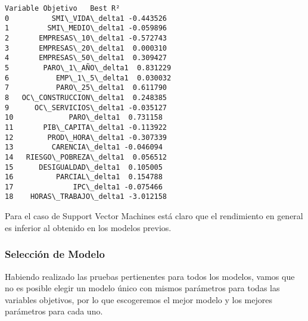 \documentclass[11pt]{article}
\begin{document}
    
    \begin{Verbatim}[commandchars=\\\{\}]
         Variable Objetivo   Best R²
0          SMI\_VIDA\_delta1 -0.443526
1         SMI\_MEDIO\_delta1 -0.059896
2       EMPRESAS\_10\_delta1 -0.572743
3       EMPRESAS\_20\_delta1  0.000310
4       EMPRESAS\_50\_delta1  0.309427
5        PARO\_1\_AÑO\_delta1  0.831229
6           EMP\_1\_5\_delta1  0.030032
7           PARO\_25\_delta1  0.611790
8   OC\_CONSTRUCCION\_delta1  0.248385
9      OC\_SERVICIOS\_delta1 -0.035127
10             PARO\_delta1  0.731158
11       PIB\_CAPITA\_delta1 -0.113922
12        PROD\_HORA\_delta1 -0.307339
13         CARENCIA\_delta1 -0.046094
14   RIESGO\_POBREZA\_delta1  0.056512
15      DESIGUALDAD\_delta1  0.105005
16          PARCIAL\_delta1  0.154788
17              IPC\_delta1 -0.075466
18    HORAS\_TRABAJO\_delta1 -3.012158
    \end{Verbatim}

    
    Para el caso de Support Vector Machines está claro que el rendimiento en
general es inferior al obtenido en los modelos previos.

    \subsubsection{Selección de Modelo}\label{selecciuxf3n-de-modelo}

    Habiendo realizado las pruebas pertienentes para todos los modelos,
vamos que no es posible elegir un modelo único con mismos parámetros
para todas las variables objetivos, por lo que escogeremos el mejor
modelo y los mejores parámetros para cada uno.
\end{document}
